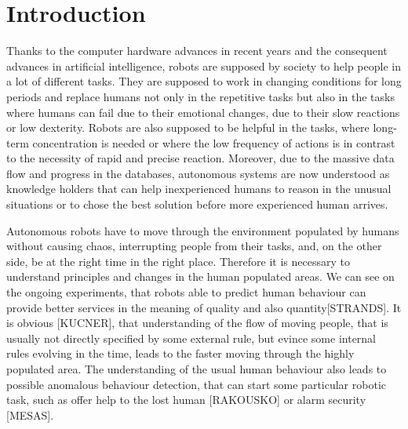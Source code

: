 \section{Introduction}

Thanks to the computer hardware advances in recent years and the consequent advances in artificial intelligence, robots are supposed by society to help people in a lot of different tasks.
They are supposed to work in changing conditions for long periods and replace humans not only in the repetitive tasks but also in the tasks where humans can fail due to their emotional changes, due to their slow reactions or low dexterity.
Robots are also supposed to be helpful in the tasks, where long-term concentration is needed or where the low frequency of actions is in contrast to the necessity of rapid and precise reaction.
Moreover, due to the massive data flow and progress in the databases, autonomous systems are now understood as knowledge holders that can help inexperienced humans to reason in the unusual situations or to chose the best solution before more experienced human arrives.

Autonomous robots have to move through the environment populated by humans without causing chaos, interrupting people from their tasks, and, on the other side, be at the right time in the right place.
Therefore it is necessary to understand principles and changes in the human populated areas.
We can see on the ongoing experiments, that robots able to predict human behaviour can provide better services in the meaning of quality and also quantity[STRANDS].
It is obvious [KUCNER], that understanding of the flow of moving people, that is usually not directly specified by some external rule, but evince some internal rules evolving in the time, leads to the faster moving through the highly populated area.
The understanding of the usual human behaviour also leads to possible anomalous behaviour detection, that can start some particular robotic task, such as offer help to the lost human [RAKOUSKO] or alarm security [MESAS].

